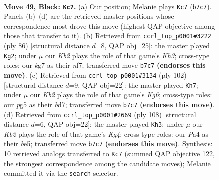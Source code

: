 \documentclass[11pt]{article}
\begin{document}
\clearpage

\begin{figure}[p]\centering
\begin{subfigure}{0.46\textwidth}\centering
\resizebox{\linewidth}{!}{%
\newchessgame
\chessboard[
  setfen={8/1k4K1/6p1/6P1/p7/3b4/8/6b1 b - - 5 49},
  showmover=false,
  pgfstyle=straightmove, color=movearrow, markmove={b7-c7}
]}
\caption{}
\end{subfigure}\hfill
\begin{subfigure}{0.46\textwidth}\centering
\resizebox{\linewidth}{!}{%
\newchessgame
\chessboard[
  setfen={8/p4n1k/7P/8/8/7K/P7/2B5 w - - 1 44},
  showmover=false,
  pgfstyle=straightmove, color=movearrow, markmove={h3-g2}
]}
\caption{}
\end{subfigure}
\\[4pt]
\begin{subfigure}{0.46\textwidth}\centering
\resizebox{\linewidth}{!}{%
\newchessgame
\chessboard[
  setfen={8/3b4/3P2K1/1p1k4/1B6/8/8/8 w - - 2 52},
  showmover=false,
  pgfstyle=straightmove, color=movearrow, markmove={g6-h7}
]}
\caption{}
\end{subfigure}\hfill
\begin{subfigure}{0.46\textwidth}\centering
\resizebox{\linewidth}{!}{%
\newchessgame
\chessboard[
  setfen={8/8/8/2kPb3/p5K1/8/B7/8 w - - 5 55},
  showmover=false,
  pgfstyle=straightmove, color=movearrow, markmove={g4-h3}
]}
\caption{}
\end{subfigure}
\caption{\textbf{Move 49, Black: \texttt{Kc7}.} (a) Our position; Melanie plays \texttt{Kc7} (\texttt{b7c7}). Panels (b)--(d) are the retrieved master positions whose correspondence most drove this move (highest QAP objective among those that transfer to it). (b) Retrieved from \texttt{ccrl\_top\_p0001\#3222} (ply 86) [structural distance $d$=8, QAP obj=25]: the master played \texttt{Kg2}; under $\mu$ our \emph{Kb2} plays the role of that game's \emph{Kh3}; cross-type roles: our \emph{k}g7 as their \emph{n}f7; transferred move \texttt{b7c7} \textbf{(endorses this move)}. (c) Retrieved from \texttt{ccrl\_top\_p0001\#3134} (ply 102) [structural distance $d$=9, QAP obj=22]: the master played \texttt{Kh7}; under $\mu$ our \emph{Kb2} plays the role of that game's \emph{Kg6}; cross-type roles: our \emph{p}g5 as their \emph{b}d7; transferred move \texttt{b7c7} \textbf{(endorses this move)}. (d) Retrieved from \texttt{ccrl\_top\_p0001\#2669} (ply 108) [structural distance $d$=6, QAP obj=22]: the master played \texttt{Kh3}; under $\mu$ our \emph{Kb2} plays the role of that game's \emph{Kg4}; cross-type roles: our \emph{P}a4 as their \emph{b}e5; transferred move \texttt{b7c7} \textbf{(endorses this move)}. Synthesis: 10 retrieved analogs transferred to \texttt{Kc7} (summed QAP objective 122, the strongest correspondence among the candidate moves); Melanie committed it via the \texttt{search} selector.}
\label{fig:thought-m97}
\end{figure}
\end{document}
